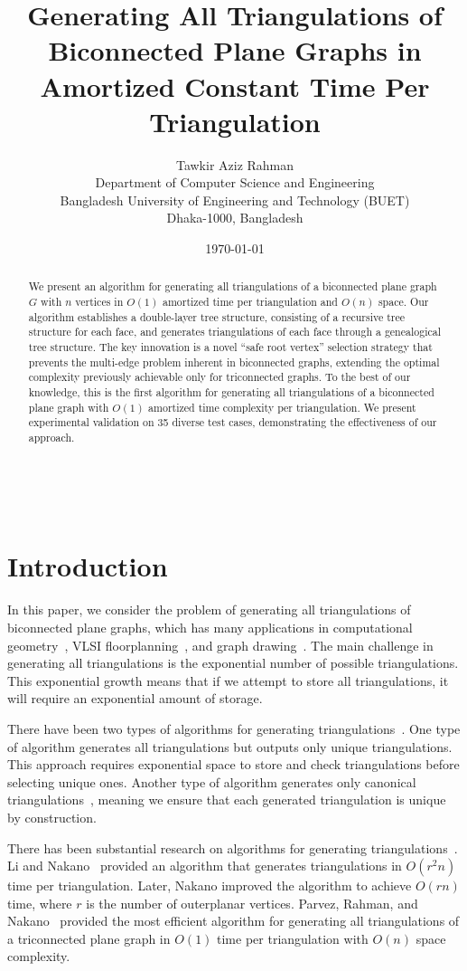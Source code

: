 ﻿﻿\documentclass[12pt,a4paper]{article}
\title{Generating All Triangulations of Biconnected Plane Graphs in Amortized Constant Time Per Triangulation}
\author{Tawkir Aziz Rahman\\
Department of Computer Science and Engineering\\
Bangladesh University of Engineering and Technology (BUET)\\
Dhaka-1000, Bangladesh}
\date{\today}
\theoremstyle{definition}
\theoremstyle{remark}
\begin{document}
\maketitle

\begin{abstract}
	We present an algorithm for generating all triangulations of a biconnected plane graph $G$ with $n$ vertices in $O(1)$ amortized time per triangulation and $O(n)$ space. Our algorithm establishes a double-layer tree structure, consisting of a recursive tree structure for each face, and generates triangulations of each face through a genealogical tree structure. The key innovation is a novel ``safe root vertex'' selection strategy that prevents the multi-edge problem inherent in biconnected graphs, extending the optimal complexity previously achievable only for triconnected graphs. To the best of our knowledge, this is the first algorithm for generating all triangulations of a biconnected plane graph with $O(1)$ amortized time complexity per triangulation. We present experimental validation on 35 diverse test cases, demonstrating the effectiveness of our approach.
\end{abstract}

\section{Introduction}
\label{sec:introduction}
In this paper, we consider the problem of generating all triangulations of biconnected plane graphs, which has many applications in computational geometry~\cite{berg2008}, VLSI floorplanning~\cite{kozminski1985}, and graph drawing~\cite{nishizeki2004}. The main challenge in generating all triangulations is the exponential number of possible triangulations. This exponential growth means that if we attempt to store all triangulations, it will require an exponential amount of storage.

There have been two types of algorithms for generating triangulations~\cite{read1978,avis1996}. One type of algorithm generates all triangulations but outputs only unique triangulations. This approach requires exponential space to store and check triangulations before selecting unique ones. Another type of algorithm generates only canonical triangulations~\cite{read1978}, meaning we ensure that each generated triangulation is unique by construction.

There has been substantial research on algorithms for generating triangulations~\cite{chazelle1991,hanke1996,sleator1988,hurtado1999}. Li and Nakano~\cite{li2001} provided an algorithm that generates triangulations in $O(r^2 n)$ time per triangulation. Later, Nakano improved the algorithm to achieve $O(rn)$ time, where $r$ is the number of outerplanar vertices. Parvez, Rahman, and Nakano~\cite{parvez2011} provided the most efficient algorithm for generating all triangulations of a triconnected plane graph in $O(1)$ time per triangulation with $O(n)$ space complexity.
\end{document}
